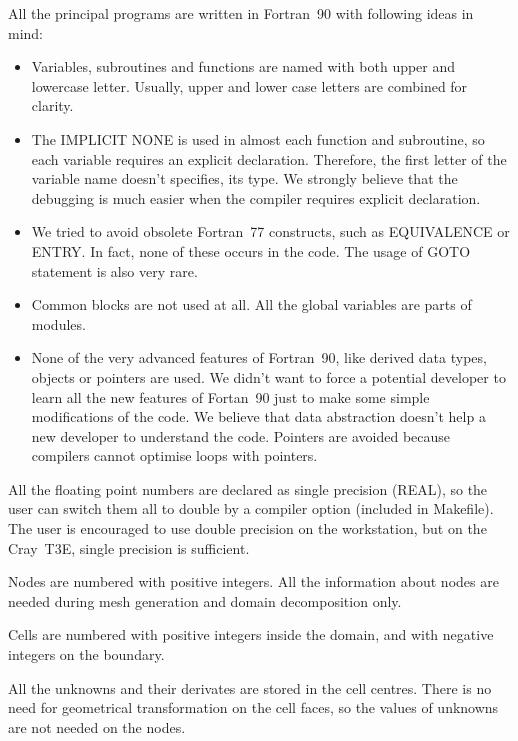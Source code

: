 \documentclass[10pt]{article}
\newcommand*{\tc}{\ttfamily} %
\begin{document}
    All the principal programs are written in Fortran~90 with
    following ideas in mind:
    \begin{itemize}
      \item Variables, subroutines and functions are named with 
            both upper and lowercase letter. Usually, upper
            and lower case letters are combined for clarity. 
      \item The {\tc IMPLICIT NONE} is used in
            almost each function and subroutine,  
            so each variable requires an explicit declaration.
            Therefore, the first letter of the variable name 
            doesn't specifies, its type. We strongly believe that
            the debugging is much easier when the compiler requires
            explicit declaration.
      \item We tried to avoid obsolete Fortran~77 constructs, such 
            as {\tc EQUIVALENCE} or {\tc ENTRY}. In fact, none of
            these occurs in the code. The usage of {\tc GOTO}
            statement is also very rare.
      \item Common blocks are not used at all. All the global
            variables are parts of modules.
      \item None of the very advanced features of Fortran~90, like
            derived data types, objects or pointers are used. We
            didn't want to force a potential developer to learn all
            the new features of Fortan~90 just to make some simple
            modifications of the code. We believe that data abstraction    
            doesn't help a new developer to understand the code.
            Pointers are avoided because compilers cannot optimise
            loops with pointers.
    \end{itemize}

    All the floating point numbers are declared as single precision
    ({\tc REAL}), so the user can switch them all to double by a compiler
    option (included in Makefile). The user is encouraged to use
    double precision on the workstation, but on the Cray~T3E, single
    precision is sufficient.

    Nodes are numbered with positive integers. All the information
    about nodes are needed during mesh generation and domain 
    decomposition only.
    
    Cells are numbered with positive integers inside the domain, 
    and with negative integers on the boundary.

    All the unknowns and their derivates are stored in the cell
    centres. There is no need for geometrical transformation on
    the cell faces, so the values of unknowns are not needed on
    the nodes.
\end{document}
